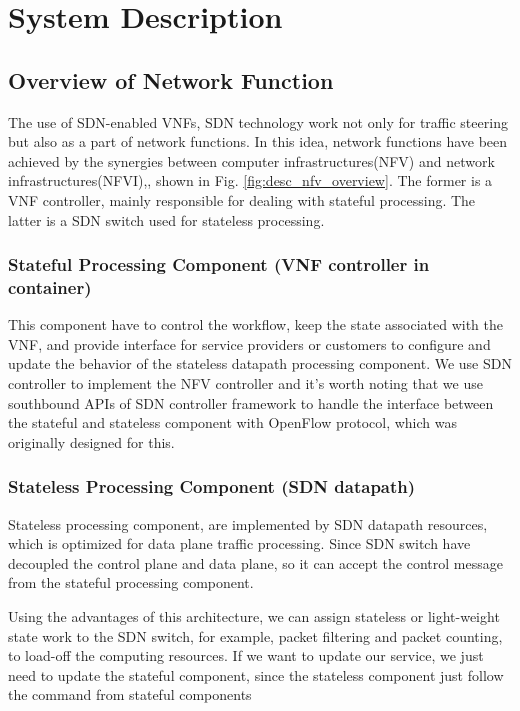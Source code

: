 \documentclass[journal]{IEEEtran}
\begin{document}
\section{System Description}
\subsection{Overview of Network Function}\label{ssec:desc_nfv_overview}
The use of SDN-enabled VNFs\cite{sdn-enabled}\cite{manage-nve}, SDN technology work not only for traffic steering but also as a part of network functions. In this idea, network functions have been achieved by the synergies between computer infrastructures(NFV) and network infrastructures(NFVI)\cite{nfv2014-v121},\cite{nfv2015}, shown in Fig. \ref{fig:desc_nfv_overview}. The former is a VNF controller, mainly responsible for dealing with stateful processing. The latter is a SDN switch used for stateless processing.

\subsubsection{Stateful Processing Component (VNF controller in container)}
This component have to control the workflow, keep the state associated with the VNF, and provide interface for service providers or customers to configure and update the behavior of the stateless datapath processing component. We use SDN controller to implement the NFV controller and it’s worth noting that we use southbound APIs of SDN controller framework to handle the interface between the stateful and stateless component with OpenFlow protocol, which was originally designed for this.

\subsubsection{Stateless Processing Component (SDN datapath)}
Stateless processing component, are implemented by SDN datapath resources, which is optimized for data plane traffic processing. Since SDN switch have decoupled the control plane and data plane, so it can accept the control message from the stateful processing component.

Using the advantages of this architecture, we can assign stateless or light-weight state work to the SDN switch, for example, packet filtering and packet counting, to load-off the computing resources. If we want to update our service, we just need to update the stateful component, since the stateless component just follow the command from stateful components
\end{document}
